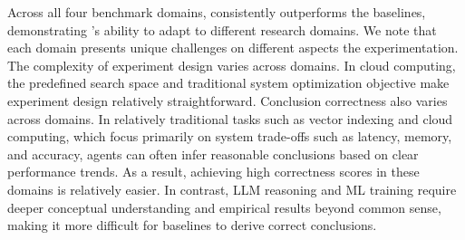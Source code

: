 Across all four benchmark domains, \sys consistently outperforms the baselines, demonstrating \sys’s ability to adapt to different research domains. 
We note that each domain presents unique challenges on different aspects the experimentation.
The complexity of experiment design varies across domains. In cloud computing, the predefined search space and traditional system optimization objective make experiment design relatively straightforward. 
Conclusion correctness also varies across domains. In relatively traditional tasks such as vector indexing and cloud computing, which focus primarily on system trade-offs such as latency, memory, and accuracy, agents can often infer reasonable conclusions based on clear performance trends. As a result, achieving high correctness scores in these domains is relatively easier. 
In contrast, LLM reasoning and ML training require deeper conceptual understanding and empirical results beyond common sense, making it more difficult for baselines to derive correct conclusions.
\fi
 








